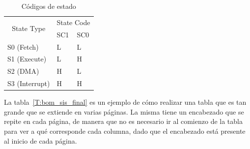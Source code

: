 \begin{table}[ht!]
\caption{Códigos de estado}
\label{T:state_codes}
\begin{tabular}{|l|ll|}
\hline
\multicolumn{1}{|c|}{\multirow{2}{*}{State Type}} & \multicolumn{2}{l|}{State Code} \\ \cline{2-3} 
\multicolumn{1}{|c|}{}                            & \multicolumn{1}{l|}{SC1}  & SC0 \\ \hline
S0 (Fetch)                                        & \multicolumn{1}{l|}{L}    & L   \\ \hline
S1 (Execute)                                      & \multicolumn{1}{l|}{L}    & H   \\ \hline
S2 (DMA)                                          & \multicolumn{1}{l|}{H}    & L   \\ \hline
S3 (Interrupt)                                    & \multicolumn{1}{l|}{H}    & H   \\ \hline
\end{tabular}
\end{table}


\clearpage

La tabla~\ref{T:bom_sis_final} es un ejemplo de cómo realizar una tabla que es tan grande que se extiende en varias páginas. La misma tiene un encabezado que se repite en cada página, de manera que no es necesario ir al comienzo de la tabla para ver a qué corresponde cada columna, dado que el encabezado está presente al inicio de cada página.

